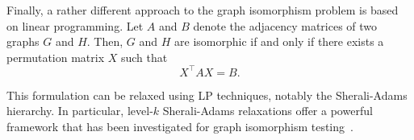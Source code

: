 Finally, a rather different approach to the graph isomorphism problem is based on linear programming. Let $A$ and $B$ denote the adjacency matrices of two graphs $G$ and $H$. Then, $G$ and $H$ are isomorphic if and only if there exists a permutation matrix $X$ such that
\[
X^\top A X = B.
\]

This formulation can be relaxed using LP techniques, notably the Sherali-Adams hierarchy. In particular, level-$k$ Sherali-Adams relaxations offer a powerful framework that has been investigated for graph isomorphism testing~\cite{grohe2012structural}.



